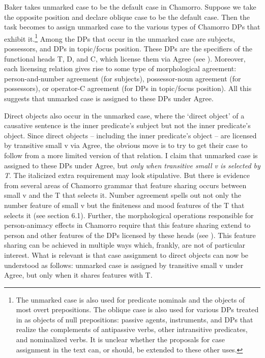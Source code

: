 \documentclass[output=paper,
modfonts
]{LSP/langsci}
\begin{document}
\begin{exe}
\begin{xlist}
Baker takes unmarked case to be the default case in Chamorro. Suppose we
take the opposite position and declare oblique case to be the default
case. Then the task becomes to assign unmarked case to the various types
of Chamorro DPs that exhibit it.\footnote{The unmarked case is also used
  for predicate nominals and the objects of most overt prepositions. The
  oblique case is also used for various DPs treated in \citealt{chung1998} as
  objects of null prepositions: passive agents, instruments, and DPs
  that realize the complements of antipassive verbs, other intransitive
  predicates, and nominalized verbs. It is unclear whether the proposals
  for case assignment in the text can, or should, be extended to these
  other uses.} Among the DPs that occur in the unmarked case are
subjects, possessors, and DPs in topic/focus position. These DPs are the
specifiers of the functional heads T, D, and C, which license them via
Agree (see \citealt{chung1998}). Moreover, each licensing relation gives rise to
some type of morphological agreement: person-and-number agreement (for
subjects), possessor-noun agreement (for possessors), or operator-C
agreement (for DPs in topic/focus position). All this suggests that
unmarked case is assigned to these DPs under Agree.

Direct objects also occur in the unmarked case, where the `direct
object' of a causative sentence is the inner predicate's subject but not
the inner predicate's object. Since direct objects -- including the inner
predicate's object -- are licensed by transitive small v via Agree, the
obvious move is to try to get their case to follow from a more limited
version of that relation. I claim that unmarked case is assigned to
these DPs under Agree, but \emph{only when transitive small v is
selected by T}. The italicized extra requirement may look stipulative.
But there is evidence from several areas of Chamorro grammar that
feature sharing occurs between small v and the T that selects it. Number
agreement spells out not only the number feature of small v but the
finiteness and mood features of the T that selects it (see section 6.1).
Further, the morphological operations responsible for person-animacy
effects in Chamorro require that this feature sharing extend to person
and other features of the DPs licensed by these heads (see \citealt{chung1998,chung2014}). This feature sharing can be achieved in multiple ways which,
frankly, are not of particular interest. What is relevant is that case
assignment to direct objects can now be understood as follows: unmarked
case is assigned by transitive small v under Agree, but only when it
shares features with T.


\end{xlist}
\end{exe}
\end{document}
